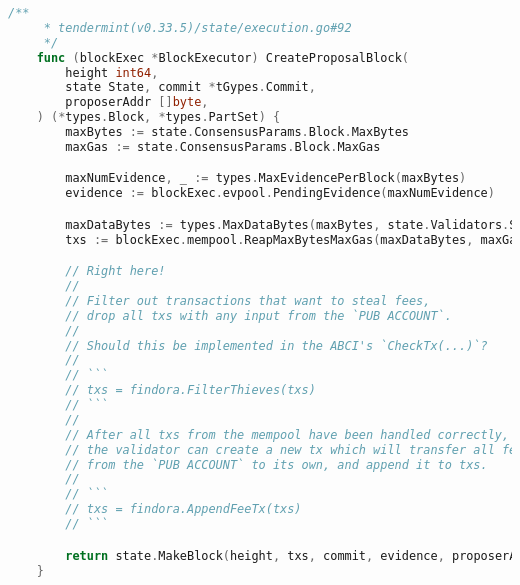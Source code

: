 \begin{lstlisting}[language=go]
    /**
     * tendermint(v0.33.5)/state/execution.go#92
     */
    func (blockExec *BlockExecutor) CreateProposalBlock(
        height int64,
        state State, commit *tGypes.Commit,
        proposerAddr []byte,
    ) (*types.Block, *types.PartSet) {
        maxBytes := state.ConsensusParams.Block.MaxBytes
        maxGas := state.ConsensusParams.Block.MaxGas

        maxNumEvidence, _ := types.MaxEvidencePerBlock(maxBytes)
        evidence := blockExec.evpool.PendingEvidence(maxNumEvidence)

        maxDataBytes := types.MaxDataBytes(maxBytes, state.Validators.Size(), len(evidence))
        txs := blockExec.mempool.ReapMaxBytesMaxGas(maxDataBytes, maxGas)

        // Right here!
        //
        // Filter out transactions that want to steal fees,
        // drop all txs with any input from the `PUB ACCOUNT`.
        //
        // Should this be implemented in the ABCI's `CheckTx(...)`?
        //
        // ```
        // txs = findora.FilterThieves(txs)
        // ```
        //
        // After all txs from the mempool have been handled correctly,
        // the validator can create a new tx which will transfer all fees
        // from the `PUB ACCOUNT` to its own, and append it to txs.
        //
        // ```
        // txs = findora.AppendFeeTx(txs)
        // ```

        return state.MakeBlock(height, txs, commit, evidence, proposerAddr)
    }
\end{lstlisting}
